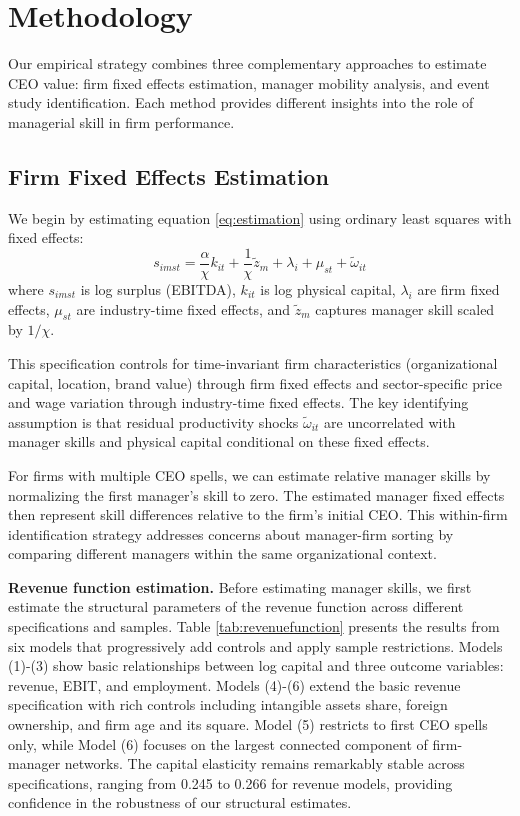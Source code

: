 \documentclass[11pt,a4paper]{article}
\begin{document}
\section{Methodology}

Our empirical strategy combines three complementary approaches to estimate CEO value: firm fixed effects estimation, manager mobility analysis, and event study identification. Each method provides different insights into the role of managerial skill in firm performance.

\subsection{Firm Fixed Effects Estimation}

We begin by estimating equation \eqref{eq:estimation} using ordinary least squares with fixed effects:
\begin{equation}
s_{imst} = \frac{\alpha}{\chi} k_{it} + \frac{1}{\chi}\tilde{z}_m + \lambda_i + \mu_{st} + \tilde{\omega}_{it}
\end{equation}
where $s_{imst}$ is log surplus (EBITDA), $k_{it}$ is log physical capital, $\lambda_i$ are firm fixed effects, $\mu_{st}$ are industry-time fixed effects, and $\tilde{z}_m$ captures manager skill scaled by $1/\chi$.

This specification controls for time-invariant firm characteristics (organizational capital, location, brand value) through firm fixed effects and sector-specific price and wage variation through industry-time fixed effects. The key identifying assumption is that residual productivity shocks $\tilde{\omega}_{it}$ are uncorrelated with manager skills and physical capital conditional on these fixed effects.

For firms with multiple CEO spells, we can estimate relative manager skills by normalizing the first manager's skill to zero. The estimated manager fixed effects then represent skill differences relative to the firm's initial CEO. This within-firm identification strategy addresses concerns about manager-firm sorting by comparing different managers within the same organizational context.

\textbf{Revenue function estimation.} Before estimating manager skills, we first estimate the structural parameters of the revenue function across different specifications and samples. Table \ref{tab:revenuefunction} presents the results from six models that progressively add controls and apply sample restrictions. Models (1)-(3) show basic relationships between log capital and three outcome variables: revenue, EBIT, and employment. Models (4)-(6) extend the basic revenue specification with rich controls including intangible assets share, foreign ownership, and firm age and its square. Model (5) restricts to first CEO spells only, while Model (6) focuses on the largest connected component of firm-manager networks. The capital elasticity remains remarkably stable across specifications, ranging from 0.245 to 0.266 for revenue models, providing confidence in the robustness of our structural estimates.
\end{document}
